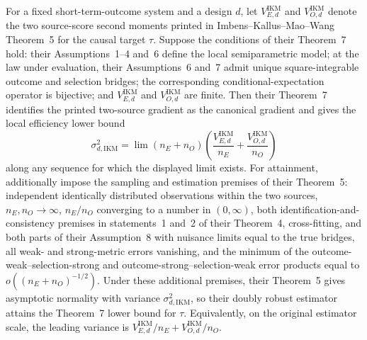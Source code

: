 For a fixed short-term-outcome system and a design \(d\), let \(V_{E,d}^{\mathrm{IKM}}\) and \(V_{O,d}^{\mathrm{IKM}}\) denote the two source-score second moments printed in Imbens--Kallus--Mao--Wang Theorem~5 for the causal target \(\tau\). Suppose the conditions of their Theorem~7 hold: their Assumptions~1--4 and~6 define the local semiparametric model; at the law under evaluation, their Assumptions~6 and~7 admit unique square-integrable outcome and selection bridges; the corresponding conditional-expectation operator is bijective; and \(V_{E,d}^{\mathrm{IKM}}\) and \(V_{O,d}^{\mathrm{IKM}}\) are finite. Then their Theorem~7 identifies the printed two-source gradient as the canonical gradient and gives the local efficiency lower bound
\[
 \sigma_{d,\mathrm{IKM}}^2
 =\lim (n_E+n_O)\left(
 \frac{V_{E,d}^{\mathrm{IKM}}}{n_E}
 +\frac{V_{O,d}^{\mathrm{IKM}}}{n_O}
 \right)
\]
along any sequence for which the displayed limit exists. For attainment, additionally impose the sampling and estimation premises of their Theorem~5: independent identically distributed observations within the two sources, \(n_E,n_O\to\infty\), \(n_E/n_O\) converging to a number in \((0,\infty)\), both identification-and-consistency premises in statements~1 and~2 of their Theorem~4, cross-fitting, and both parts of their Assumption~8 with nuisance limits equal to the true bridges, all weak- and strong-metric errors vanishing, and the minimum of the outcome-weak--selection-strong and outcome-strong--selection-weak error products equal to \(o((n_E+n_O)^{-1/2})\). Under these additional premises, their Theorem~5 gives asymptotic normality with variance \(\sigma_{d,\mathrm{IKM}}^2\), so their doubly robust estimator attains the Theorem~7 lower bound for \(\tau\). Equivalently, on the original estimator scale, the leading variance is \(V_{E,d}^{\mathrm{IKM}}/n_E+V_{O,d}^{\mathrm{IKM}}/n_O\).